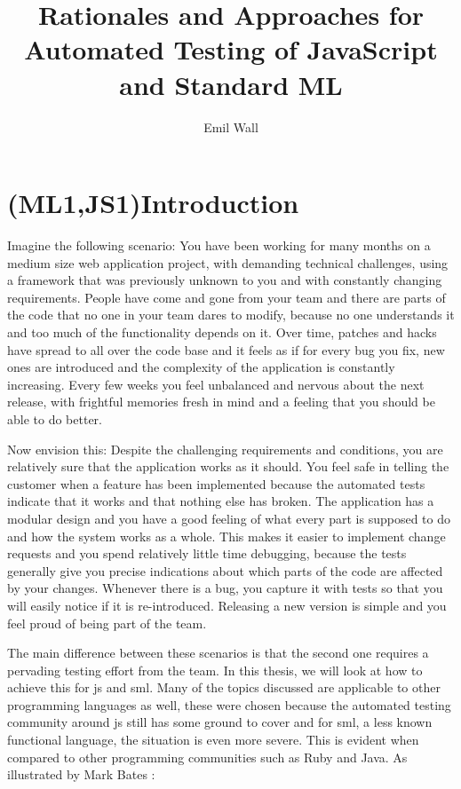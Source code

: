 \documentclass[11pt]{article}
\title{Rationales and Approaches for Automated Testing of JavaScript and Standard ML}
\author{Emil Wall}
\begin{document}
%
\tableofcontents %

\printglossaries

\newpage

\section{(ML1,JS1)Introduction}

Imagine the following scenario: You have been working for many months on a medium size web application project, with demanding technical challenges, using a framework that was previously unknown to you and with constantly changing requirements. People have come and gone from your team and there are parts of the code that no one in your team dares to modify, because no one understands it and too much of the functionality depends on it. Over time, patches and hacks have spread to all over the code base and it feels as if for every bug you fix, new ones are introduced and the complexity of the application is constantly increasing. Every few weeks you feel unbalanced and nervous about the next release, with frightful memories fresh in mind and a feeling that you should be able to do better.

Now envision this: Despite the challenging requirements and conditions, you are relatively sure that the application works as it should. You feel safe in telling the customer when a feature has been implemented because the automated tests indicate that it works and that nothing else has broken. The application has a modular design and you have a good feeling of what every part is supposed to do and how the system works as a whole. This makes it easier to implement change requests and you spend relatively little time debugging, because the tests generally give you precise indications about which parts of the code are affected by your changes. Whenever there is a bug, you capture it with tests so that you will easily notice if it is re-introduced. Releasing a new version is simple and you feel proud of being part of the team.

The main difference between these scenarios is that the second one requires a pervading \gls{testing} effort from the team. In this thesis, we will look at how to achieve this for \gls{js} and \gls{sml}. Many of the topics discussed are applicable to other programming languages as well, these were chosen because the automated testing community around \gls{js} still has some ground to cover \cite[p.~xix]{Tddjs} and for \gls{sml}, a less known functional language, the situation is even more severe. This is evident when compared to other programming communities such as Ruby and Java. As illustrated by Mark Bates \cite{TestingStatistics}:
\end{document}
